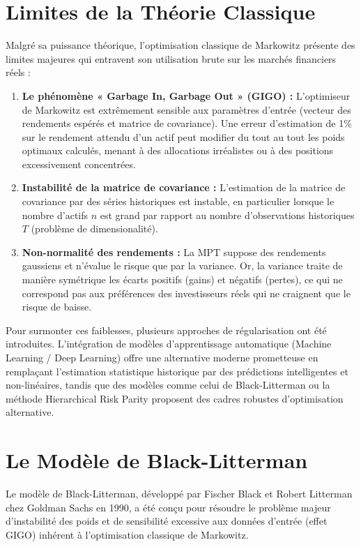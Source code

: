 \section{Limites de la Théorie Classique}
Malgré sa puissance théorique, l'optimisation classique de Markowitz présente des limites majeures qui entravent son utilisation brute sur les marchés financiers réels :

\begin{enumerate}
    \item \textbf{Le phénomène « Garbage In, Garbage Out » (GIGO) :} L'optimiseur de Markowitz est extrêmement sensible aux paramètres d'entrée (vecteur des rendements espérés et matrice de covariance). Une erreur d'estimation de 1\% sur le rendement attendu d'un actif peut modifier du tout au tout les poids optimaux calculés, menant à des allocations irréalistes ou à des positions excessivement concentrées.
    \item \textbf{Instabilité de la matrice de covariance :} L'estimation de la matrice de covariance par des séries historiques est instable, en particulier lorsque le nombre d'actifs $n$ est grand par rapport au nombre d'observations historiques $T$ (problème de dimensionalité).
    \item \textbf{Non-normalité des rendements :} La MPT suppose des rendements gaussiens et n'évalue le risque que par la variance. Or, la variance traite de manière symétrique les écarts positifs (gains) et négatifs (pertes), ce qui ne correspond pas aux préférences des investisseurs réels qui ne craignent que le risque de baisse.
\end{enumerate}

Pour surmonter ces faiblesses, plusieurs approches de régularisation ont été introduites. L'intégration de modèles d'apprentissage automatique (Machine Learning / Deep Learning) offre une alternative moderne prometteuse en remplaçant l'estimation statistique historique par des prédictions intelligentes et non-linéaires, tandis que des modèles comme celui de Black-Litterman ou la méthode Hierarchical Risk Parity proposent des cadres robustes d'optimisation alternative.

\section{Le Modèle de Black-Litterman}
Le modèle de Black-Litterman, développé par Fischer Black et Robert Litterman chez Goldman Sachs en 1990, a été conçu pour résoudre le problème majeur d'instabilité des poids et de sensibilité excessive aux données d'entrée (effet GIGO) inhérent à l'optimisation classique de Markowitz. 

